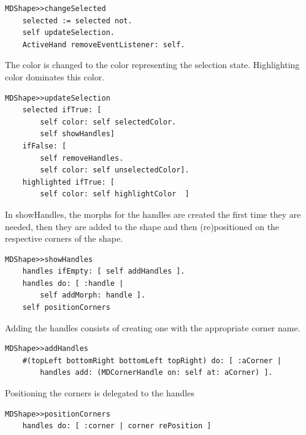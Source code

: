 \documentclass[10pt, twoside]{article}   	%
\begin{document}
\begin{verbatim}
MDShape>>changeSelected
    selected := selected not.
    self updateSelection. 
    ActiveHand removeEventListener: self.
\end{verbatim}
The color is changed to the color representing the 
selection state. Highlighting color dominates this color.
\begin{verbatim}
MDShape>>updateSelection
    selected ifTrue: [ 
        self color: self selectedColor.
        self showHandles]
    ifFalse: [ 
        self removeHandles.
        self color: self unselectedColor].
    highlighted ifTrue: [ 
        self color: self highlightColor  ]
\end{verbatim}
In showHandles, the morphs for the handles
are created the first time they are needed, then they are 
added to the shape and then (re)positioned on the respective
corners of the shape.
\begin{verbatim} 
MDShape>>showHandles
    handles ifEmpty: [ self addHandles ].
    handles do: [ :handle |
        self addMorph: handle ].
    self positionCorners
\end{verbatim}
Adding the handles consists of creating one with the
appropriate corner name.
\begin{verbatim}
MDShape>>addHandles
    #(topLeft bottomRight bottomLeft topRight) do: [ :aCorner | 
        handles add: (MDCornerHandle on: self at: aCorner) ].
\end{verbatim}
Positioning the corners is delegated to the handles
\begin{verbatim}
MDShape>>positionCorners
    handles do: [ :corner | corner rePosition ]
\end{verbatim}
\end{document}
